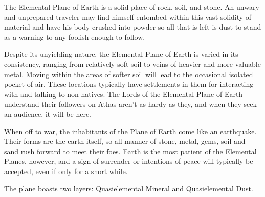 The Elemental Plane of Earth is a solid place of rock, soil, and stone. An unwary and unprepared traveler may find himself entombed within this vast solidity of material and have his body crushed into powder so all that is left is dust to stand as a warning to any foolish enough to follow.

Despite its unyielding nature, the Elemental Plane of Earth is varied in its consistency, ranging from relatively soft soil to veins of heavier and more valuable metal. Moving within the areas of softer soil will lead to the occasional isolated pocket of air. These locations typically have settlements in them for interacting with and talking to non-natives. The Lords of the Elemental Plane of Earth understand their followers on Athas aren't as hardy as they, and when they seek an audience, it will be here.

When off to war, the inhabitants of the Plane of Earth come like an earthquake. Their forms are the earth itself, so all manner of stone, metal, gems, soil and sand rush forward to meet their foes. Earth is the most patient of the Elemental Planes, however, and a sign of surrender or intentions of peace will typically be accepted, even if only for a short while.

The plane boasts two layers: Quasielemental Mineral and Quasielemental Dust.

\begin{figure}[b!]
\centering
{}
\end{figure}

